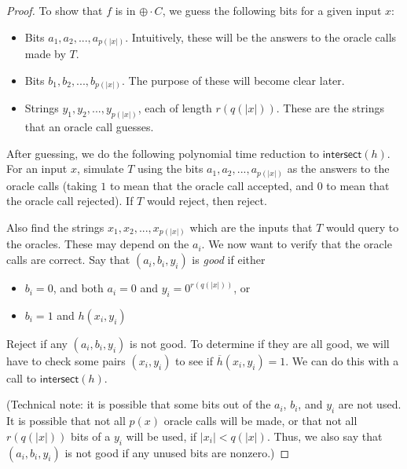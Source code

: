 \documentclass[11pt]{article}
\newcommand{\parity}{\oplus}
\newcommand{\intersect}{\textsf{intersect}}
\begin{document}
\begin{proof}
To show that $f$ is in $\parity \cdot C$, we guess the following bits for a given input $x$:
\begin{itemize}
\item Bits $a_1,a_2,...,a_{p(|x|)}$. Intuitively, these will be the answers to the oracle calls made by $T$.
\item Bits $b_1,b_2,...,b_{p(|x|)}$. The purpose of these will become clear later.
\item Strings $y_1,y_2,...,y_{p(|x|)}$, each of length $r(q(|x|))$. These are the strings that an oracle call guesses.
\end{itemize}
After guessing, we do the following polynomial time reduction to $\intersect(h)$. For an input $x$, simulate $T$ using the bits $a_1,a_2,...,a_{p(|x|)}$ as the answers to the oracle calls (taking $1$ to mean that the oracle call accepted, and $0$ to mean that the oracle call rejected). If $T$ would reject, then reject.

Also find the strings $x_1,x_2,...,x_{p(|x|)}$ which are the inputs that $T$ would query to the oracles. These may depend on the $a_i$. We now want to verify that the oracle calls are correct. Say that $(a_i, b_i, y_i)$ is \emph{good} if either
\begin{itemize}
\item $b_i = 0$, and both $a_i = 0$ and $y_i = 0^{r(q(|x|))}$, or
\item $b_i = 1$ and $h(x_i, y_i)$
\end{itemize}
Reject if any $(a_i, b_i, y_i)$ is not good. To determine if they are all good, we will have to check some pairs $(x_i, y_i)$ to see if $\overline{h}(x_i,y_i) = 1$. We can do this with a call to $\intersect(h)$.

(Technical note: it is possible that some bits out of the $a_i$, $b_i$, and $y_i$ are not used. It is possible that not all $p(x)$ oracle calls will be made, or that not all $r(q(|x|))$ bits of a $y_i$ will be used, if $|x_i| < q(|x|)$. Thus, we also say that $(a_i, b_i, y_i)$ is not good if any unused bits are nonzero.)


\end{proof}
\end{document}
